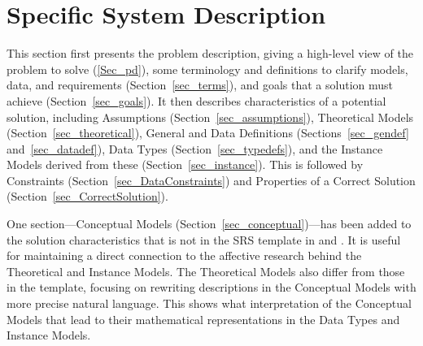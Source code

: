 \section{Specific System Description}\label{sec_SpecDesc}
This section first presents the problem description, giving a high-level view 
of the problem to solve (\ref{Sec_pd}), some terminology and definitions to 
clarify models, data, and requirements (Section~\ref{sec_terms}), and goals 
that a solution must achieve (Section~\ref{sec_goals}). It then describes 
characteristics of a potential solution, including Assumptions 
(Section~\ref{sec_assumptions}), Theoretical Models 
(Section~\ref{sec_theoretical}), General and Data Definitions 
(Sections~\ref{sec_gendef} and~\ref{sec_datadef}), Data Types 
(Section~\ref{sec_typedefs}), and the Instance Models derived from these 
(Section~\ref{sec_instance}). This is followed by Constraints 
(Section~\ref{sec_DataConstraints}) and Properties of a Correct Solution 
(Section~\ref{sec_CorrectSolution}).

One section---Conceptual Models (Section~\ref{sec_conceptual})---has been added 
to the solution characteristics that is not in the SRS template in 
\cite{SmithAndLai2005} and \cite{SmithEtAl2007}. It is useful for maintaining a 
direct connection to the affective research behind the Theoretical and Instance 
Models. The Theoretical Models also differ from those in the template, focusing 
on rewriting descriptions in the Conceptual Models with more precise natural 
language. This shows what interpretation of the Conceptual Models that lead to 
their mathematical representations in the Data Types and Instance Models.



\newpage

